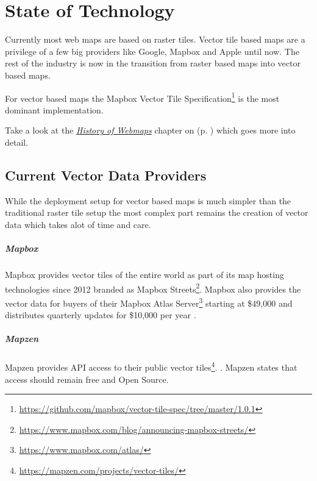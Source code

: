 \chapter{State of Technology}

Currently most web maps are based on raster tiles. Vector tile based maps are
a privilege of a few big providers like Google, Mapbox and Apple until now. The rest of the industry is now in the transition from raster based maps into vector based maps.

For vector based maps the Mapbox Vector Tile Specification\footnote{\url{https://github.com/mapbox/vector-tile-spec/tree/master/1.0.1}} is the most dominant implementation.

Take a look at the \hyperref[history-of-webmaps]{\emph{History of Webmaps}} chapter on (p. \pageref{history-of-webmaps}) which goes more into detail.

\section{Current Vector Data Providers}

While the deployment setup for vector based maps is much simpler than
the traditional raster tile setup the most complex part remains
the creation of vector data which takes alot of time and care.

\paragraph{Mapbox}

Mapbox provides vector tiles of the entire world as part of its
map hosting technologies since 2012 branded as Mapbox Streets\footnote{\url{https://www.mapbox.com/blog/announcing-mapbox-streets/}}. Mapbox also provides the vector data for buyers of their Mapbox Atlas Server\footnote{\url{https://www.mapbox.com/atlas/}} starting at \$49,000 and distributes quarterly updates for \$10,000 per year .

\paragraph{Mapzen}

Mapzen provides API access to their public vector tiles\footnote{\url{https://mapzen.com/projects/vector-tiles/}}.
. Mapzen states that access should remain free and Open Source.

